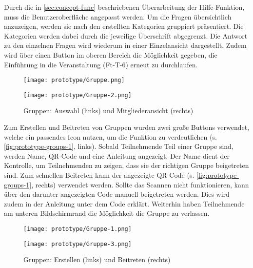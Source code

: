 Durch die in \autoref{sec:concept-func} beschriebenen Überarbeitung der
Hilfe-Funktion, muss die Benutzeroberfläche angepasst werden. Um die
Fragen übersichtlich anzuzeigen, werden sie nach den erstellten Kategorien
gruppiert präsentiert. Die Kategorien werden dabei durch die jeweilige
Überschrift abgegrenzt. Die Antwort zu den einzelnen Fragen wird wiederum in
einer Einzelansicht dargestellt. Zudem wird über einen Button im oberen Bereich
die Möglichkeit gegeben, die Einführung in die Veranstaltung (Ft-T-6) erneut zu durchlaufen.

\begin{figure}[htpb]
    \begin{minipage}{.5\textwidth}
        \centering
        \texttt{[image: prototype/Gruppe.png]}
    \end{minipage}%
    \begin{minipage}{.5\textwidth}
        \centering
        \texttt{[image: prototype/Gruppe-2.png]}
    \end{minipage}
    \caption{Gruppen: Auswahl (links) und Mitgliederansicht (rechts)}
    \label{fig:prototype-groups-1}
\end{figure}

Zum Erstellen und Beitreten von Gruppen wurden zwei große Buttons verwendet,
welche ein passendes Icon nutzen, um die Funktion zu verdeutlichen (s.
\autoref{fig:prototype-groups-1}, links). Sobald Teilnehmende Teil einer Gruppe
sind, werden Name, QR-Code und eine Anleitung angezeigt. Der Name dient der
Kontrolle, um Teilnehmenden zu zeigen, dass sie der richtigen Gruppe beigetreten
sind. Zum schnellen Beitreten kann der angezeigte QR-Code (s.
\autoref{fig:prototype-groups-1}, rechts) verwendet werden. Sollte das Scannen
nicht funktionieren, kann über den darunter angezeigten Code manuell beigetreten
werden. Dies wird zudem in der Anleitung unter dem Code erklärt. Weiterhin haben
Teilnehmende am unteren Bildschirmrand die Möglichkeit die Gruppe zu verlassen.

\begin{figure}[htpb]
    \begin{minipage}{.5\textwidth}
        \centering
        \texttt{[image: prototype/Gruppe-1.png]}
    \end{minipage}%
    \begin{minipage}{.5\textwidth}
        \centering
        \texttt{[image: prototype/Gruppe-3.png]}
    \end{minipage}
    \caption{Gruppen: Erstellen (links) und Beitreten (rechts)}
    \label{fig:prototype-groups-2}
\end{figure}

